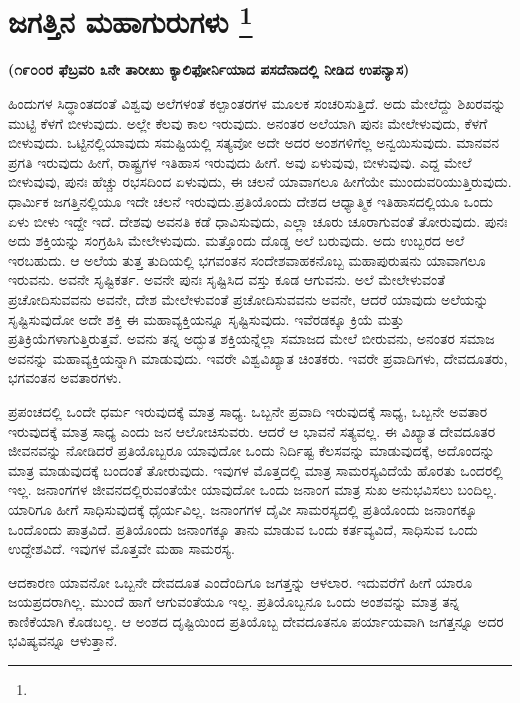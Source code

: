 
\chapter[ಜಗತ್ತಿನ ಮಹಾಗುರುಗಳು]{ಜಗತ್ತಿನ ಮಹಾಗುರುಗಳು \protect\footnote{}}

\begin{center}
\textbf{(೧೯೦೦ರ ಫೆಬ್ರವರಿ ೩ನೇ ತಾರೀಖು ಕ್ಯಾಲಿಫೋರ್ನಿಯಾದ ಪಸದೆನಾದಲ್ಲಿ ನೀಡಿದ ಉಪನ್ಯಾಸ)}
\end{center}

ಹಿಂದುಗಳ ಸಿದ್ಧಾಂತದಂತೆ ವಿಶ್ವವು ಅಲೆಗಳಂತೆ ಕಲ್ಪಾಂತರಗಳ ಮೂಲಕ ಸಂಚರಿಸು\-ತ್ತಿದೆ. ಅದು ಮೇಲೆದ್ದು ಶಿಖರವನ್ನು ಮುಟ್ಟಿ ಕೆಳಗೆ ಬೀಳುವುದು. ಅಲ್ಲೇ ಕೆಲವು ಕಾಲ ಇರುವುದು. ಅನಂತರ ಅಲೆಯಾಗಿ ಪುನಃ ಮೇಲೇಳುವುದು, ಕೆಳಗೆ ಬೀಳುವುದು. ಒಟ್ಟಿನಲ್ಲಿ\break ಯಾವುದು ಸಮಷ್ಟಿಯಲ್ಲಿ ಸತ್ಯವೋ ಅದೇ ಅದರ ಅಂಶಗಳಿಗೆಲ್ಲ ಅನ್ವಯಿಸುವುದು. ಮಾನ\-ವನ ಪ್ರಗತಿ ಇರುವುದು ಹೀಗೆ, ರಾಷ್ಟ್ರಗಳ ಇತಿಹಾಸ ಇರುವುದು ಹೀಗೆ. ಅವು ಏಳುವುವು, ಬೀಳುವುವು. ಎದ್ದ ಮೇಲೆ ಬೀಳುವುವು, ಪುನಃ ಹೆಚ್ಚು ರಭಸದಿಂದ ಏಳುವುದು, ಈ ಚಲನೆ ಯಾವಾಗಲೂ ಹೀಗೆಯೇ ಮುಂದುವರಿಯುತ್ತಿರುವುದು. ಧಾರ್ಮಿಕ ಜಗತ್ತಿನಲ್ಲಿಯೂ ಇದೇ ಚಲನೆ ಇರುವುದು.ಪ್ರತಿಯೊಂದು ದೇಶದ ಆಧ್ಯಾತ್ಮಿಕ ಇತಿಹಾಸದಲ್ಲಿಯೂ ಒಂದು ಏಳು ಬೀಳು ಇದ್ದೇ ಇದೆ. ದೇಶವು ಅವನತಿ ಕಡೆ ಧಾವಿಸುವುದು, ಎಲ್ಲಾ ಚೂರು ಚೂರಾಗುವಂತೆ ತೋರುವುದು. ಪುನಃ ಅದು ಶಕ್ತಿಯನ್ನು ಸಂಗ್ರಹಿಸಿ ಮೇಲೇಳುವುದು. ಮತ್ತೊಂದು ದೊಡ್ಡ ಅಲೆ ಬರುವುದು. ಅದು ಉಬ್ಬರದ ಅಲೆ ಇರಬಹುದು. ಆ ಅಲೆಯ ತುತ್ತ ತುದಿಯಲ್ಲಿ ಭಗವಂತನ ಸಂದೇಶವಾಹಕನೊಬ್ಬ ಮಹಾಪುರುಷನು ಯಾವಾಗಲೂ ಇರುವನು. ಅವನೇ ಸೃಷ್ಟಿಕರ್ತ. ಅವನೇ ಪುನಃ ಸೃಷ್ಟಿಸಿದ ವಸ್ತು ಕೂಡ ಆಗುವನು. ಅಲೆ ಮೇಲೇಳುವಂತೆ ಪ್ರಚೋದಿಸುವವನು ಅವನೇ, ದೇಶ ಮೇಲೇಳುವಂತೆ ಪ್ರಚೋದಿಸು\-ವವನು ಅವನೇ, ಆದರೆ ಯಾವುದು ಅಲೆಯನ್ನು ಸೃಷ್ಟಿಸುವುದೋ ಅದೇ ಶಕ್ತಿ ಈ ಮಹಾವ್ಯಕ್ತಿಯನ್ನೂ ಸೃಷ್ಟಿಸುವುದು. ಇವೆರಡಕ್ಕೂ ಕ್ರಿಯೆ ಮತ್ತು ಪ್ರತಿಕ್ರಿಯೆಗಳಾಗುತ್ತಿರುತ್ತವೆ. ಅವನು ತನ್ನ ಅದ್ಭುತ ಶಕ್ತಿಯನ್ನೆಲ್ಲಾ ಸಮಾಜದ ಮೇಲೆ ಬೀರುವನು, ಅನಂತರ ಸಮಾಜ ಅವನನ್ನು ಮಹಾವ್ಯಕ್ತಿಯನ್ನಾಗಿ ಮಾಡುವುದು. ಇವರೇ ವಿಶ್ವವಿಖ್ಯಾತ ಚಿಂತಕರು. ಇವರೇ ಪ್ರವಾದಿಗಳು, ದೇವದೂತರು, ಭಗವಂತನ ಅವತಾರಗಳು.

ಪ್ರಪಂಚದಲ್ಲಿ ಒಂದೇ ಧರ್ಮ ಇರುವುದಕ್ಕೆ ಮಾತ್ರ ಸಾಧ್ಯ. ಒಬ್ಬನೇ ಪ್ರವಾದಿ ಇರುವುದಕ್ಕೆ ಸಾಧ್ಯ, ಒಬ್ಬನೇ ಅವತಾರ ಇರುವುದಕ್ಕೆ ಮಾತ್ರ ಸಾಧ್ಯ ಎಂದು ಜನ ಆಲೋಚಿಸುವರು. ಆದರೆ ಆ ಭಾವನೆ ಸತ್ಯವಲ್ಲ. ಈ ವಿಖ್ಯಾತ ದೇವದೂತರ ಜೀವನವನ್ನು ನೋಡಿದರೆ ಪ್ರತಿಯೊಬ್ಬರೂ ಯಾವುದೋ ಒಂದು ನಿರ್ದಿಷ್ಟ ಕೆಲಸವನ್ನು ಮಾಡುವುದಕ್ಕೆ, ಅದೊಂದನ್ನು ಮಾತ್ರ ಮಾಡುವುದಕ್ಕೆ ಬಂದಂತೆ ತೋರುವುದು. ಇವುಗಳ ಮೊತ್ತದಲ್ಲಿ ಮಾತ್ರ ಸಾಮರಸ್ಯವಿದೆಯೆ ಹೊರತು ಒಂದರಲ್ಲಿ ಇಲ್ಲ. ಜನಾಂಗಗಳ ಜೀವನದಲ್ಲಿರುವಂತೆಯೇ ಯಾವುದೋ ಒಂದು ಜನಾಂಗ ಮಾತ್ರ ಸುಖ ಅನುಭವಿಸಲು ಬಂದಿಲ್ಲ. ಯಾರಿಗೂ ಹೀಗೆ ಸಾಧಿಸುವುದಕ್ಕೆ ಧೈರ್ಯವಿಲ್ಲ. ಜನಾಂಗಗಳ ದೈವೀ ಸಾಮರಸ್ಯದಲ್ಲಿ ಪ್ರತಿಯೊಂದು ಜನಾಂಗಕ್ಕೂ ಒಂದೊಂದು ಪಾತ್ರವಿದೆ. ಪ್ರತಿಯೊಂದು ಜನಾಂಗಕ್ಕೂ ತಾನು ಮಾಡುವ ಒಂದು ಕರ್ತವ್ಯವಿದೆ, ಸಾಧಿಸುವ ಒಂದು ಉದ್ದೇಶವಿದೆ. ಇವುಗಳ ಮೊತ್ತವೇ ಮಹಾ ಸಾಮರಸ್ಯ.

ಆದಕಾರಣ ಯಾವನೋ ಒಬ್ಬನೇ ದೇವದೂತ ಎಂದೆಂದಿಗೂ ಜಗತ್ತನ್ನು ಆಳಲಾರ. ಇದುವರೆಗೆ ಹೀಗೆ ಯಾರೂ ಜಯಪ್ರದರಾಗಿಲ್ಲ. ಮುಂದೆ ಹಾಗೆ ಆಗುವಂತೆಯೂ ಇಲ್ಲ. ಪ್ರತಿಯೊಬ್ಬನೂ ಒಂದು ಅಂಶವನ್ನು ಮಾತ್ರ ತನ್ನ ಕಾಣಿಕೆಯಾಗಿ ಕೊಡಬಲ್ಲ. ಆ ಅಂಶದ ದೃಷ್ಟಿಯಿಂದ ಪ್ರತಿಯೊಬ್ಬ ದೇವದೂತನೂ ಪರ್ಯಾಯವಾಗಿ ಜಗತ್ತನ್ನೂ ಅದರ ಭವಿಷ್ಯವನ್ನೂ ಆಳುತ್ತಾನೆ.

